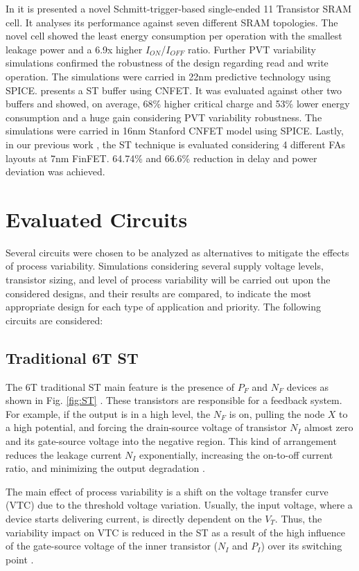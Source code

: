 \documentclass[pgmicro,diss,english]{iiufrgs}
\begin{document}
 In \cite{ahmad2016single} it is presented a novel Schmitt-trigger-based single-ended 11 Transistor SRAM cell. It analyses its performance against seven different SRAM topologies. The novel cell showed the least energy consumption per operation with the smallest leakage power and a 6.9x higher $I_{ON}$/$I_{OFF}$ ratio. Further PVT variability simulations confirmed the robustness of the design regarding read and write operation. The simulations were carried in 22nm predictive technology using SPICE. \cite{moghaddam2017design} presents a ST buffer using CNFET. It was evaluated against other two buffers and showed, on average, 68\% higher critical charge and 53\% lower energy consumption and a huge gain considering PVT variability robustness. The simulations were carried in 16nm Stanford CNFET model using SPICE. Lastly, in our previous work \cite{moraes2018evaluation}, the ST technique is evaluated considering 4 different FAs layouts at 7nm FinFET. 64.74\% and 66.6\% reduction in delay and power deviation was achieved.

\section{Evaluated Circuits}

Several circuits were chosen to be analyzed as alternatives to mitigate the effects of process variability. Simulations considering several supply voltage levels, transistor sizing, and level of process variability will be carried out upon the considered designs, and their results are compared, to indicate the most appropriate design for each type of application and priority. The following circuits are considered:


\subsection{Traditional 6T ST}
The 6T traditional ST main feature is the presence of ${P_F}$ and ${N_F}$ devices as shown in Fig. \ref{fig:ST} \cite{doki1984cmos}. These transistors are responsible for a feedback system. For example, if the output is in a high level, the ${N_F}$ is on, pulling the node ${X}$ to a high potential, and forcing the drain-source voltage of transistor ${N_I}$ almost zero and its gate-source voltage into the negative region. This kind of arrangement reduces the leakage current ${N_I}$ exponentially, increasing the on-to-off current ratio, and minimizing the output degradation \cite{lotze2017ultra}.

The main effect of process variability is a shift on the voltage transfer curve (VTC) due to the threshold voltage variation. Usually, the input voltage, where a device starts delivering current, is directly dependent on the $V_T$. Thus, the variability impact on VTC is reduced in the ST as a result of the high influence of the gate-source voltage of the inner transistor ($N_I$ and $P_I$) over its switching point \cite{lotze2017ultra}.
\end{document}
